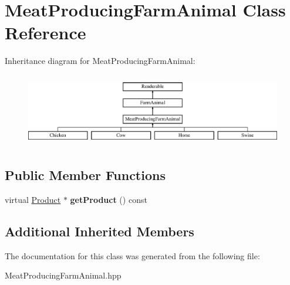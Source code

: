 \hypertarget{class_meat_producing_farm_animal}{}\section{Meat\+Producing\+Farm\+Animal Class Reference}
\label{class_meat_producing_farm_animal}
Inheritance diagram for Meat\+Producing\+Farm\+Animal\+:\begin{figure}[H]
\begin{center}
\leavevmode
\includegraphics[height=3.236994cm]{class_meat_producing_farm_animal}
\end{center}
\end{figure}
\subsection*{Public Member Functions}
\begin{DoxyCompactItemize}
\item 
\mbox{\label{class_meat_producing_farm_animal_a9c9abaad45cf6a4aa4a45b8b4295ebe5}} 
virtual \mbox{\hyperlink{class_product}{Product}} $\ast$ {\bfseries get\+Product} () const
\end{DoxyCompactItemize}
\subsection*{Additional Inherited Members}


The documentation for this class was generated from the following file\+:\begin{DoxyCompactItemize}
\item 
Meat\+Producing\+Farm\+Animal.\+hpp\end{DoxyCompactItemize}
